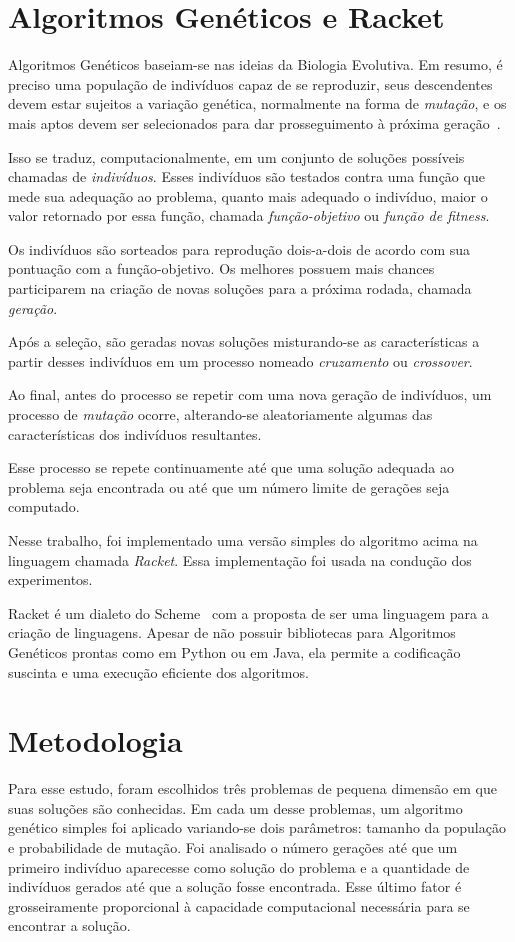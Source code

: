 \documentclass{llncs}
\begin{document}
%
\section{Algoritmos Genéticos e Racket}
%
Algoritmos Genéticos baseiam-se nas ideias da Biologia Evolutiva. Em resumo, é preciso uma população de indivíduos capaz de se reproduzir, seus descendentes devem estar sujeitos a variação genética, normalmente na forma de \emph{mutação}, e os mais aptos devem ser selecionados para dar prosseguimento à próxima geração~\cite{castro}.

Isso se traduz, computacionalmente, em um conjunto de soluções possíveis chamadas de \emph{indivíduos}. Esses indivíduos são testados contra uma função que mede sua adequação ao problema, quanto mais adequado o indivíduo, maior o valor retornado por essa função, chamada \emph{função-objetivo} ou \emph{função de fitness}.

Os indivíduos são sorteados para reprodução dois-a-dois de acordo com sua pontuação com a função-objetivo. Os melhores possuem mais chances participarem na criação de novas soluções para a próxima rodada, chamada \emph{geração}.

Após a seleção, são geradas novas soluções misturando-se as características a partir desses indivíduos em um processo nomeado \emph{cruzamento} ou \emph{crossover}.

Ao final, antes do processo se repetir com uma nova geração de indivíduos, um processo de \emph{mutação} ocorre, alterando-se aleatoriamente algumas das características dos indivíduos resultantes.

Esse processo se repete continuamente até que uma solução adequada ao problema seja encontrada ou até que um número limite de gerações seja computado.

Nesse trabalho, foi implementado uma versão simples do algoritmo acima na linguagem chamada \emph{Racket}. Essa implementação foi usada na condução dos experimentos.

Racket é um dialeto do Scheme~\cite{racket} com a proposta de ser uma linguagem para a criação de linguagens. Apesar de não possuir bibliotecas para Algoritmos Genéticos prontas como em Python ou em Java, ela permite a codificação suscinta e uma execução eficiente dos algoritmos.

%
\section{Metodologia}
%
Para esse estudo, foram escolhidos três problemas de pequena dimensão em que suas soluções são conhecidas. Em cada um desse problemas, um algoritmo genético simples foi aplicado variando-se dois parâmetros: tamanho da população e probabilidade de mutação. Foi analisado o número gerações até que um primeiro indivíduo aparecesse como solução do problema e a quantidade de indivíduos gerados até que a solução fosse encontrada. Esse último fator é grosseiramente proporcional à capacidade computacional necessária para se encontrar a solução.
\end{document}
